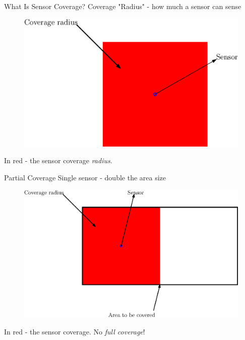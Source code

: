 \documentclass[t]{beamer}
\begin{document}
\begin{frame}[label=motivation3]{What Is Sensor Coverage?}
Coverage "Radius" - how much a sensor can sense

\begin{figure}[b]
\includegraphics[scale=0.5]{motivation/coverage-radius.eps}
\end{figure}

In red - the sensor coverage \emph{radius}.
\end{frame}
\begin{frame}[label=motivation4]{Partial Coverage}
Single sensor - double the area size

\begin{figure}[b]
\includegraphics[scale=0.5]{motivation/partial-coverage.eps}
\end{figure}
In red - the sensor coverage. No \emph{full coverage}!
\end{frame}
\end{document}
